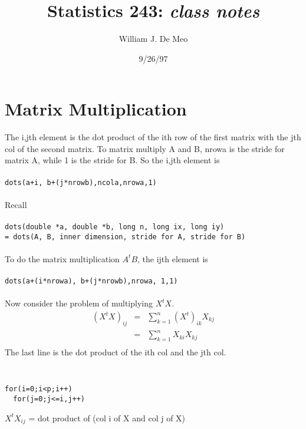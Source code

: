 \documentclass{article}
\begin{document}
\title{Statistics 243: \emph{class notes}}
\author{William J. De Meo}
\date{9/26/97 }
\maketitle
\section{Matrix Multiplication}
The i,jth element is the dot product of the ith row of the first matrix with
the jth col of the second matrix.
To matrix multiply A and B, nrowa is the stride for matrix A, 
while 1 is the stride for B.  So the i,jth element is\\\\
{\tt dots(a+i, b+(j*nrowb),ncola,nrowa,1)}\\\\
Recall \\\\
{\tt dots(double *a, double *b, long n, long ix, long iy) \\
= dots(A, B, inner dimension, stride for A, stride for B)}\\
\\
To do the matrix multiplication $A^tB$, the ijth element is \\
\\
{\tt dots(a+(i*nrowa), b+(j*nrowb),nrowa, 1,1)}
\\\\
Now consider the problem of multiplying $X^tX$.
\begin{eqnarray*}
(X^tX)_{ij} & =& \sum_{k=1}^n(X^t)_{ik}X_{kj}\\
&  = &\sum_{k=1}^nX_{ki}X_{kj}\\
\end{eqnarray*}
The last line is the dot product of the ith col and the jth col.
{\tt
\begin{verbatim}
for(i=0;i<p;i++)
  for(j=0;j<=i,j++)
\end{verbatim}}
\indent $X^tX_{ij}$ = dot product of (col i of X and col j of X)
\end{document}
